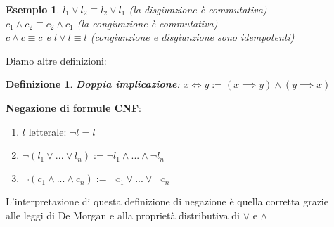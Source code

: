 \documentclass[a4paper,12pt]{article}
\theoremstyle{def}
\newtheorem*{definition}{Definizione}
\theoremstyle{prop}
\theoremstyle{esempio}
\newtheorem*{example}{Esempio}
\theoremstyle{dimostrazione}
\theoremstyle{teo}
\theoremstyle{osservazione}
\begin{document}
\begin{example}
	\(l_1 \lor l_2 \equiv l_2 \lor l_1\) (la disgiunzione è commutativa)\\
	\(c_1 \land c_2 \equiv c_2 \land c_1\) (la congiunzione è commutativa)\\
	\(c \land c \equiv c\) e \(l \lor l \equiv l\) (congiunzione e disgiunzione sono idempotenti)\\
\end{example}
\newpage
Diamo altre definizioni:\\
\begin{definition}
	\textbf{Doppia implicazione}: \(x \iff y := (x \implies y)\land(y \implies x)\)
\end{definition}
\textbf{Negazione di formule CNF}:
\begin{enumerate}
	\item \(l\) letterale: \(\neg l = \overline{l}\)
	\item \(\neg (l_1 \lor ... \lor l_n) := \neg l_1 \land ... \land \neg l_n\)
	\item \(\neg (c_1 \land ... \land c_n) := \neg c_1 \lor ... \lor \neg c_n\)
\end{enumerate}
L'interpretazione di questa definizione di negazione è quella corretta grazie\\
alle leggi di De Morgan e alla proprietà distributiva di \(\lor\) e \(\land\)\\
\end{document}
